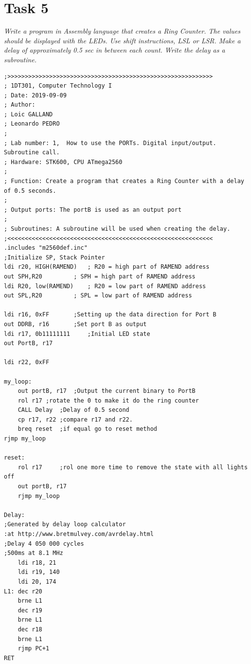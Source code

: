 \documentclass[a4paper,12pt]{article}
\begin{document}
\section{Task 5}
\textit{Write a program in Assembly language that creates a Ring Counter. The values should be
displayed with the LEDs. Use shift instructions, LSL or LSR.
Make a delay of approximately 0.5 sec in between each count. Write the delay as a
subroutine.}
\lstset{style=Asm}
\begin{lstlisting}
;>>>>>>>>>>>>>>>>>>>>>>>>>>>>>>>>>>>>>>>>>>>>>>>>>>>>>>>>>>>
; 1DT301, Computer Technology I
; Date: 2019-09-09
; Author:
; Loic GALLAND
; Leonardo PEDRO
;
; Lab number: 1,  How to use the PORTs. Digital input/output. Subroutine call.
; Hardware: STK600, CPU ATmega2560
;
; Function: Create a program that creates a Ring Counter with a delay of 0.5 seconds. 
;
; Output ports: The portB is used as an output port
;
; Subroutines: A subroutine will be used when creating the delay. 
;<<<<<<<<<<<<<<<<<<<<<<<<<<<<<<<<<<<<<<<<<<<<<<<<<<<<<<<<<<<
.includes "m2560def.inc"
;Initialize SP, Stack Pointer
ldi r20, HIGH(RAMEND)	; R20 = high part of RAMEND address
out SPH,R20 		; SPH = high part of RAMEND address
ldi R20, low(RAMEND) 	; R20 = low part of RAMEND address
out SPL,R20 		; SPL = low part of RAMEND address

ldi r16, 0xFF 		;Setting up the data direction for Port B
out DDRB, r16 		;Set port B as output
ldi r17, 0b11111111 	;Initial LED state
out PortB, r17

ldi r22, 0xFF

my_loop:
	out portB, r17	;Output the current binary to PortB
	rol r17	;rotate the 0 to make it do the ring counter
	CALL Delay	;Delay of 0.5 second
	cp r17, r22	;compare r17 and r22.
	breq reset	;if equal go to reset method
rjmp my_loop

reset:
	rol r17		;rol one more time to remove the state with all lights off
	out portB, r17
	rjmp my_loop

Delay:
;Generated by delay loop calculator
:at http://www.bretmulvey.com/avrdelay.html
;Delay 4 050 000 cycles
;500ms at 8.1 MHz
	ldi r18, 21
	ldi r19, 140
	ldi 20, 174
L1:	dec r20
	brne L1
	dec r19
	brne L1
	dec r18
	brne L1
	rjmp PC+1
RET
\end{lstlisting}
\end{document}
